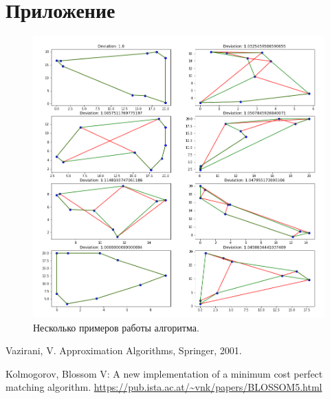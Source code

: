 \documentclass[a4paper,12pt]{article}
\theoremstyle{plain}
\theoremstyle{definition}
\theoremstyle{remark}
\begin{document}
\newpage
\section{Приложение}

\begin{figure}[h!]
    \centering
    \includegraphics[width=18cm]{img/samples_gauss_fixed.png}
    \caption{Несколько примеров работы алгоритма.}
\end{figure}


\begin{thebibliography}{}
     Vazirani, V. Approximation Algorithms, Springer, 2001.

     Kolmogorov, Blossom V: A new implementation of a minimum cost perfect matching algorithm. \url{https://pub.ista.ac.at/~vnk/papers/BLOSSOM5.html}
\end{thebibliography}
\end{document}
